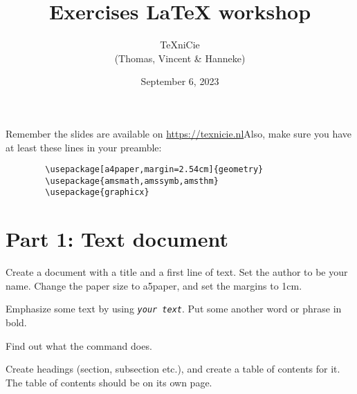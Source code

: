\documentclass[a4paper]{article}
\title{\vspace{-65pt} Exercises LaTeX workshop}
\author{\TeX niCie\\
{\small (Thomas, Vincent \& Hanneke)}
}
\date{September 6, 2023}
\begin{document}
\maketitle


Remember the slides are available on \url{https://texnicie.nl}\quad Also, make sure you have at least these lines in your preamble:
\begin{verbatim}
        \usepackage[a4paper,margin=2.54cm]{geometry}
        \usepackage{amsmath,amssymb,amsthm}
        \usepackage{graphicx}
    \end{verbatim}

\section{Part 1: Text document}

\begin{exercise}
    Create a document with a title and a first line of text. Set the author to
    be your name. Change the paper size to a5paper, and set the margins to 1cm.
\end{exercise}

\begin{exercise}[emphasize]
    Emphasize some text by using \texttt{\emph{your text}}. Put some another word
    or phrase in bold.
    
\end{exercise}

\begin{exercise}[flushright]
    Find out what the \texttt{\flushright} command does.
\end{exercise}

\begin{exercise}[headings]
    Create headings (section, subsection etc.), and create
    a table of contents for it. The table of contents should be on its own page.
\end{exercise}
\end{document}

